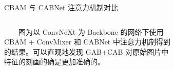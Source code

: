 \documentclass[9pt, aspectratio=1610]{beamer}
\begin{document}
    \begin{frame}{CBAM 与 CABNet 注意力机制对比}
    \begin{columns}
        \begin{column}{0.4\textwidth}
            　　图为以 ConvNeXt 为 Backbone 的网络下使用 CBAM + ConvMixer 和 CABNet 中注意力机制得到的结果。可以直观地发现 GAB+CAB 对原始图片中特征的刻画的确是更加准确的。
        \end{column}
        \begin{column}{0.6\textwidth}
                    
            \begin{figure}[H]
                \centering
                \begin{subfigure}[b]{0.2\textwidth}
                    \raggedleft
                    \includegraphics[width=\textwidth]{image-1.png}
                \end{subfigure}
                \hspace{2mm}
                \begin{subfigure}[b]{0.2\textwidth}
                    \centering

\end{subfigure}
\end{figure}
\end{column}
\end{columns}
\end{frame}
\end{document}

